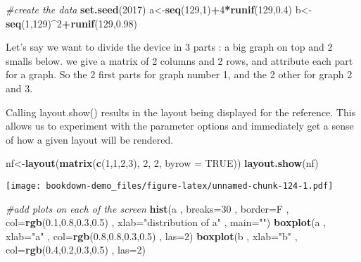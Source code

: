 \documentclass[]{book}
\newenvironment{Shaded}{\begin{snugshade}}{\end{snugshade}}
\newcommand{\KeywordTok}[1]{\textcolor[rgb]{0.13,0.29,0.53}{\textbf{#1}}}
\newcommand{\DataTypeTok}[1]{\textcolor[rgb]{0.13,0.29,0.53}{#1}}
\newcommand{\DecValTok}[1]{\textcolor[rgb]{0.00,0.00,0.81}{#1}}
\newcommand{\FloatTok}[1]{\textcolor[rgb]{0.00,0.00,0.81}{#1}}
\newcommand{\StringTok}[1]{\textcolor[rgb]{0.31,0.60,0.02}{#1}}
\newcommand{\CommentTok}[1]{\textcolor[rgb]{0.56,0.35,0.01}{\textit{#1}}}
\newcommand{\OtherTok}[1]{\textcolor[rgb]{0.56,0.35,0.01}{#1}}
\newcommand{\OperatorTok}[1]{\textcolor[rgb]{0.81,0.36,0.00}{\textbf{#1}}}
\newcommand{\NormalTok}[1]{#1}
\theoremstyle{definition}
\theoremstyle{definition}
\theoremstyle{definition}
\theoremstyle{remark}
\begin{document}
\begin{Shaded}
\begin{Highlighting}[]
\CommentTok{#create the data}
\KeywordTok{set.seed}\NormalTok{(}\DecValTok{2017}\NormalTok{)}
\NormalTok{a<-}\KeywordTok{seq}\NormalTok{(}\DecValTok{129}\NormalTok{,}\DecValTok{1}\NormalTok{)}\OperatorTok{+}\DecValTok{4}\OperatorTok{*}\KeywordTok{runif}\NormalTok{(}\DecValTok{129}\NormalTok{,}\FloatTok{0.4}\NormalTok{)}
\NormalTok{b<-}\KeywordTok{seq}\NormalTok{(}\DecValTok{1}\NormalTok{,}\DecValTok{129}\NormalTok{)}\OperatorTok{^}\DecValTok{2}\OperatorTok{+}\KeywordTok{runif}\NormalTok{(}\DecValTok{129}\NormalTok{,}\FloatTok{0.98}\NormalTok{)}
\end{Highlighting}
\end{Shaded}

Let's say we want to divide the device in 3 parts : a big graph on top
and 2 smalls below. we give a matrix of 2 columns and 2 rows, and
attribute each part for a graph. So the 2 first parts for graph number
1, and the 2 other for graph 2 and 3.

Calling layout.show() results in the layout being displayed for the
reference. This allows us to experiment with the parameter options and
immediately get a sense of how a given layout will be rendered.

\begin{Shaded}
\begin{Highlighting}[]
\NormalTok{nf<-}\KeywordTok{layout}\NormalTok{(}\KeywordTok{matrix}\NormalTok{(}\KeywordTok{c}\NormalTok{(}\DecValTok{1}\NormalTok{,}\DecValTok{1}\NormalTok{,}\DecValTok{2}\NormalTok{,}\DecValTok{3}\NormalTok{), }\DecValTok{2}\NormalTok{, }\DecValTok{2}\NormalTok{, }\DataTypeTok{byrow =} \OtherTok{TRUE}\NormalTok{))}
\KeywordTok{layout.show}\NormalTok{(nf)}
\end{Highlighting}
\end{Shaded}

\texttt{[image: bookdown-demo\_files/figure-latex/unnamed-chunk-124-1.pdf]}

\begin{Shaded}
\begin{Highlighting}[]
\CommentTok{#add plots on each of the screen}
\KeywordTok{hist}\NormalTok{(a , }\DataTypeTok{breaks=}\DecValTok{30}\NormalTok{ , }\DataTypeTok{border=}\NormalTok{F , }\DataTypeTok{col=}\KeywordTok{rgb}\NormalTok{(}\FloatTok{0.1}\NormalTok{,}\FloatTok{0.8}\NormalTok{,}\FloatTok{0.3}\NormalTok{,}\FloatTok{0.5}\NormalTok{) , }\DataTypeTok{xlab=}\StringTok{"distribution of a"}\NormalTok{ , }\DataTypeTok{main=}\StringTok{""}\NormalTok{)}
\KeywordTok{boxplot}\NormalTok{(a , }\DataTypeTok{xlab=}\StringTok{"a"}\NormalTok{ , }\DataTypeTok{col=}\KeywordTok{rgb}\NormalTok{(}\FloatTok{0.8}\NormalTok{,}\FloatTok{0.8}\NormalTok{,}\FloatTok{0.3}\NormalTok{,}\FloatTok{0.5}\NormalTok{) , }\DataTypeTok{las=}\DecValTok{2}\NormalTok{)}
\KeywordTok{boxplot}\NormalTok{(b , }\DataTypeTok{xlab=}\StringTok{"b"}\NormalTok{ , }\DataTypeTok{col=}\KeywordTok{rgb}\NormalTok{(}\FloatTok{0.4}\NormalTok{,}\FloatTok{0.2}\NormalTok{,}\FloatTok{0.3}\NormalTok{,}\FloatTok{0.5}\NormalTok{) , }\DataTypeTok{las=}\DecValTok{2}\NormalTok{)}
\end{Highlighting}
\end{Shaded}
\end{document}
